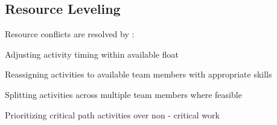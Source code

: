 \subsection{Resource Leveling}

Resource conflicts are resolved by :

\begin {
  enumerate
}
\item Adjusting activity timing within available float
    \item Reassigning activities to available team members with appropriate
        skills
    \item Splitting activities across multiple team members where feasible
    \item Prioritizing critical path activities over non -
    critical work
\end {
  enumerate
}

